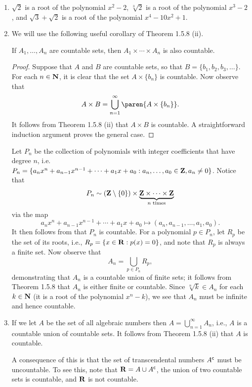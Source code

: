 \documentclass{lew98_solutions}
\begin{document}
\begin{solution}
    \begin{enumerate}
        \item \( \sqrt{2} \) is a root of the polynomial \( x^2 - 2 \), \( \sqrt[3]{2} \) is a root of the polynomial \( x^3 - 2 \), and \( \sqrt{3} + \sqrt{2} \) is a root of the polynomial \( x^4 - 10 x^2 + 1 \).

        \item We will use the following useful corollary of Theorem 1.5.8 (ii).
        \begin{lemma}
        \label{lem:ex1.5.9}
            If \( A_1, \ldots, A_n \) are countable sets, then \( A_1 \times \cdots \times A_n \) is also countable.
        \end{lemma}

        \begin{proof}
            Suppose that \( A \) and \( B \) are countable sets, so that \( B = \{ b_1, b_2, b_3, \ldots \} \). For each \( n \in \mathbf{N} \), it is clear that the set \( A \times \{ b_n \} \) is countable. Now observe that
            \[
                A \times B = \bigcup_{n=1}^{\infty} \paren{ A \times \{ b_n \} }.
            \]
            It follows from Theorem 1.5.8 (ii) that \( A \times B \) is countable. A straightforward induction argument proves the general case.
        \end{proof}
        
        Let \( P_n \) be the collection of polynomials with integer coefficients that have degree \( n \), i.e.\ \( P_n = \{ a_n x^n + a_{n-1} x^{n-1} + \cdots + a_1 x + a_0 : a_n, \ldots, a_0 \in \mathbf{Z}, a_n \neq 0 \} \). Notice that
        \[
            P_n \sim (\mathbf{Z} \setminus \{ 0 \}) \times \underbrace{\mathbf{Z} \times \cdots \times \mathbf{Z}}_{n \text{ times}}
        \]
        via the map
        \[
            a_n x^n + a_{n-1} x^{n-1} + \cdots + a_1 x + a_0 \mapsto (a_n, a_{n-1}, \ldots, a_1, a_0).
        \]
        It then follows from  that \( P_n \) is countable. For a polynomial \( p \in P_n \), let \( R_p \) be the set of its roots, i.e., \( R_p = \{ x \in \mathbf{R} : p(x) = 0 \} \), and note that \( R_p \) is always a finite set. Now observe that
        \[
            A_n = \bigcup_{p \in P_n} R_p,
        \]
        demonstrating that \( A_n \) is a countable union of finite sets; it follows from Theorem 1.5.8 that \( A_n \) is either finite or countable. Since \( \sqrt[n]{k} \in A_n \) for each \( k \in \mathbf{N} \) (it is a root of the polynomial \( x^n - k \)), we see that \( A_n \) must be infinite and hence countable.

        \item If we let \( A \) be the set of all algebraic numbers then \( A = \bigcup_{n=1}^{\infty} A_n \), i.e., \( A \) is a countable union of countable sets. It follows from Theorem 1.5.8 (ii) that \( A \) is countable.

        A consequence of this is that the set of transcendental numbers \( A^{\mathsf{c}} \) must be uncountable. To see this, note that \( \mathbf{R} = A \cup A^{\mathsf{c}} \), the union of two countable sets is countable, and \( \mathbf{R} \) is not countable.
    \end{enumerate}
\end{solution}
\end{document}
